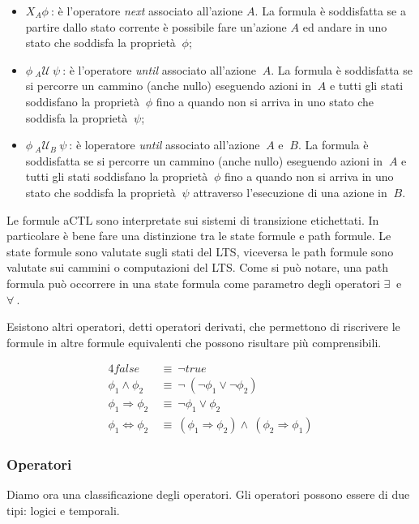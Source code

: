 \begin{itemize}
 \item $X_A \phi\ $: è l'operatore \emph{next} associato all'azione $A$. La formula è soddisfatta se a partire dallo stato corrente è possibile fare un'azione $A$ ed andare in uno stato che soddisfa la proprietà $\ \phi$;
 
 \item $\phi\ {}_{A}\mathcal{U}\ \psi\ $: è l'operatore \emph{until} associato all'azione $\ A$. La formula è soddisfatta se si percorre un cammino (anche nullo) eseguendo azioni in $\ A$ e tutti gli stati soddisfano la proprietà $\ \phi$ fino a quando non si arriva in uno stato che soddisfa la proprietà $\ \psi$;
 
 \item $\phi\ {}_{A}\mathcal{U}_B\ \psi\ $: è loperatore \emph{until} associato all'azione $\ A$ e $\ B$. La formula è soddisfatta se si percorre un cammino (anche nullo) eseguendo azioni in $\ A$ e tutti gli stati soddisfano la proprietà $\ \phi$ fino a quando non si arriva in uno stato che soddisfa la proprietà $\ \psi$ attraverso l'esecuzione di una azione in $\ B$.
\end{itemize}

Le formule aCTL sono interpretate sui sistemi di transizione etichettati. In particolare è bene fare una distinzione tra le state formule e path formule. Le state formule sono valutate sugli stati del LTS, viceversa le path formule sono valutate sui cammini o computazioni del LTS.
Come si può notare, una path formula può occorrere in una state formula come parametro degli operatori $\exists\ $ e $\forall\ $.


Esistono altri operatori, detti operatori derivati, che permettono di riscrivere le formule in altre formule equivalenti che possono risultare più comprensibili.

\begin{alignat}{4}
false\  & \equiv\ \neg true \\
\phi_1 \wedge \phi_2\ & \equiv\ \neg\ ( \neg\phi_1 \vee \neg\phi_2 ) \\
\phi_1 \Rightarrow \phi_2\ & \equiv\ \neg\phi_1 \vee \phi_2\ \\
\phi_1 \Leftrightarrow \phi_2\ & \equiv\ (\phi_1 \Rightarrow \phi_2) \wedge\ (\phi_2 \Rightarrow \phi_1)  
\end{alignat}


\clearpage
\subsubsection{Operatori}
Diamo ora una classificazione degli operatori. Gli operatori possono essere di due tipi: logici e temporali.
\\

